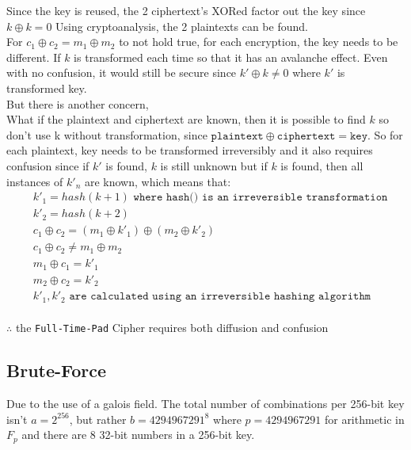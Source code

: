 \documentclass[fleqn, a4paper,12pt]{article}
\begin{document}
Since the key is reused, the 2 ciphertext's XORed factor out the key since $k \oplus k = 0$
Using cryptoanalysis, the 2 plaintexts can be found. 
\\
For $c_1 \oplus c_2 = m_1 \oplus m_2$ to not hold true, for each encryption, the key needs to be different. If $k$ is transformed each time so that it has an avalanche effect. Even with no confusion, it would still be secure since $k' \oplus k \neq  0$ where $k'$ is transformed key. 
\\
But there is another concern,
\\
What if the plaintext and ciphertext are known, then it is possible to find $k$ so don't use k without transformation, since $\texttt{plaintext} \oplus \texttt{ciphertext} = \texttt{key}$. So for each plaintext, key needs to be transformed irreversibly and it also requires confusion since if $k'$ is found, $k$ is still unknown but if $k$ is found, then all instances of $k'_n$ are known, which means that: 
\[
\begin{aligned}
&k'_1 = hash(k+1) \texttt{ where hash() is an irreversible transformation} \\
&k'_2 = hash(k+2) \\
&c_1 \oplus c_2 = (m_1 \oplus k'_1) \oplus (m_2 \oplus k'_2) \\
&c_1 \oplus c_2 \neq m_1 \oplus m_2 \\
&m_1 \oplus c_1 = k'_1 \\
&m_2 \oplus c_2 = k'_2 \\
&k'_1, k'_2 \texttt{  are calculated using an irreversible hashing algorithm }
\end{aligned}
\]
\\


$\therefore$ the \texttt{Full-Time-Pad} Cipher requires both diffusion and confusion

\subsection{Brute-Force}

Due to the use of a galois field. The total number of combinations per 256-bit key isn't $a=2^{256}$, but rather $b=4294967291^8$ where $p=4294967291$ for arithmetic in $F_p$ and there are 8 32-bit numbers in a 256-bit key.
\end{document}
